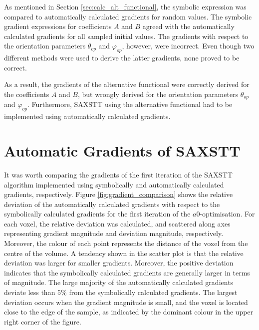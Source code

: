 
As mentioned in Section \ref{sec:calc_alt_functional}, the symbolic expression was compared to automatically calculated gradients for random values.
The symbolic gradient expressions for coefficients $A$ and $B$ agreed with the automatically calculated gradients for all sampled initial values.
The gradients with respect to the orientation parameters $\theta_{op}$ and $\varphi_{op}$, however, were incorrect.
Even though two different methods were used to derive the latter gradients, none proved to be correct.

As a result, the gradients of the alternative functional were correctly derived for the coefficients $A$ and $B$,
but wrongly derived for the orientation parameters $\theta_{op}$ and $\varphi_{op}$.
Furthermore, SAXSTT using the alternative functional had to be implemented using automatically calculated gradients.

\section{Automatic Gradients of SAXSTT}

It was worth comparing the gradients of the first iteration of the SAXSTT algorithm implemented using symbolically and automatically calculated gradients, respectively.
Figure \ref{fig:gradient_comparison} shows
the relative deviation of the automatically calculated gradients with respect to the symbolically calculated gradients for the first iteration of the $a0$-optimisation.
For each voxel, the relative deviation was calculated, and scattered along axes representing gradient magnitude and deviation magnitude, respectively.
Moreover, the colour of each point represents the distance of the voxel from the centre of the volume.
A tendency shown in the scatter plot is that the relative deviation was larger for smaller gradients.
Moreover, the positive deviation indicates that the symbolically calculated gradients are generally larger in terms of magnitude.
The large majority of the automatically calculated gradients deviate less than $5\%$ from the symbolically calculated gradients.
The largest deviation occurs when the gradient magnitude is small, and the voxel is located close to the edge of the sample,
as indicated by the dominant colour in the upper right corner of the figure.

